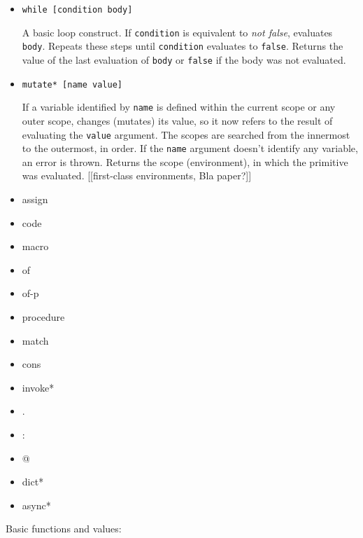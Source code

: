 \begin{itemize}
    \item \texttt{while [condition body]}
    
    A basic loop construct. If \texttt{condition} is equivalent to \textit{not false}, evaluates \texttt{body}. Repeats these steps until \texttt{condition} evaluates to \texttt{false}. Returns the value of the last evaluation of \texttt{body} or \texttt{false} if the body was not evaluated.
    
    \item \texttt{mutate* [name value]}
    
    If a variable identified by \texttt{name} is defined within the current scope or any outer scope, changes (mutates) its value, so it now refers to the result of evaluating the \texttt{value} argument. The scopes are searched from the innermost to the outermost, in order. If the \texttt{name} argument doesn't identify any variable, an error is thrown. Returns the scope (environment), in which the primitive was evaluated. [[first-class environments, Bla paper?]]
    
    \item assign
    
    \item code
    
    \item macro
    
    \item of
    
    \item of-p
    
    \item procedure
    
    \item match
    
    \item cons
    
    \item invoke*
    
    \item .

    \item :
    
    \item @
    
    \item dict*
    
    \item async*
\end{itemize}

Basic functions and values:

